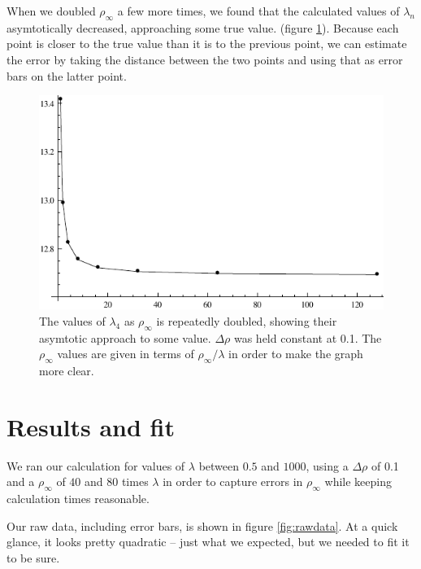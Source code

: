 \documentclass[12pt,twoside]{reedthesis}
\begin{document}
When we doubled $\rho_{\infty}$ a few more times, we found that the calculated values of $\lambda_{n}$ asymtotically decreased, approaching some true value. (figure \ref{fig:asymtote}). Because each point is closer to the true value than it is to the previous point, we can estimate the error by taking the distance between the two points and using that as error bars on the latter point.

\begin{figure}[h]
\centering
\includegraphics{Figures/asymtote}
\caption[Asymtotic behavior of $\lambda_{4} (\rho_{\infty})$]{The values of $\lambda_{4}$ as $\rho_{\infty}$ is repeatedly doubled, showing their asymtotic approach to some value. $\Delta \rho$ was held constant at 0.1. The $\rho_{\infty}$ values are given in terms of $\rho_{\infty}/\lambda$ in order to make the graph more clear.}
\label{fig:asymtote}
\end{figure} 

\section{Results and fit}
We ran our calculation for values of $\lambda$ between $0.5$ and $1000$, using a $\Delta \rho$ of 0.1 and a $\rho_{\infty}$ of $40$ and $80$ times $\lambda$ in order to capture errors in $\rho_{\infty}$ while keeping calculation times reasonable.

Our raw data, including error bars, is shown in figure \ref{fig:rawdata}. At a quick glance, it looks pretty quadratic -- just what we expected, but we needed to fit it to be sure.
\end{document}
